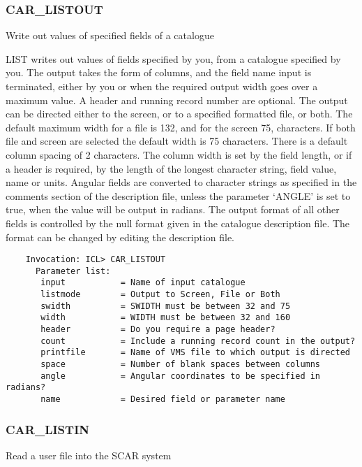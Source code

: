 \subsubsection{CAR\_LISTOUT}

Write out values of specified fields of a catalogue

LIST writes out values of fields specified by you, from a
catalogue specified by you.  
The output takes the form of columns, and the field name input is 
terminated, either by you or when the required output width goes 
over a maximum value.  
A header and running record number are optional.
The output can be directed either to the screen, or to a specified
formatted file, or both.  
The default maximum width for a file is 132, and for the screen 75, 
characters.  
If both file and screen are selected the default width is 75 characters.  
There is a default column spacing of 2 characters.  
The column width is set by the field length, or if a header is required, 
by the length of the longest character string, field value, name or units.
Angular fields are converted to character strings as specified in
the comments section of the description file, unless the parameter
`ANGLE' is set to true, when the value will be output in radians.
The output format of all other fields is controlled by the null
format given in the catalogue description file.  The format can be
changed by editing the description file.
\begin{verbatim}
    Invocation: ICL> CAR_LISTOUT
      Parameter list:
       input           = Name of input catalogue
       listmode        = Output to Screen, File or Both
       swidth          = SWIDTH must be between 32 and 75
       width           = WIDTH must be between 32 and 160
       header          = Do you require a page header?
       count           = Include a running record count in the output?
       printfile       = Name of VMS file to which output is directed
       space           = Number of blank spaces between columns
       angle           = Angular coordinates to be specified in radians?
       name            = Desired field or parameter name
\end{verbatim}

\subsubsection{CAR\_LISTIN}

Read a user file into the SCAR system

